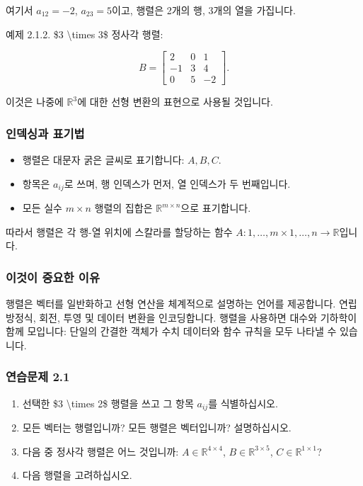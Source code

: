 \documentclass[
  12pt,
  a4paper,
]{article}
\begin{document}
여기서 \(a_{12} = -2\), \(a_{23} = 5\)이고, 행렬은 2개의 행, 3개의 열을 가집니다.

예제 2.1.2. \$3 \textbackslash times 3\$ 정사각 행렬:

\[B = \begin{bmatrix}
2 & 0 & 1 \\
-1 & 3 & 4 \\
0 & 5 & -2
\end{bmatrix}.\]

이것은 나중에 \(\mathbb{R}^3\)에 대한 선형 변환의 표현으로 사용될 것입니다.

\subsubsection{인덱싱과 표기법}\label{indexing-and-notation}

\begin{itemize}
\item
  행렬은 대문자 굵은 글씨로 표기합니다: \(A, B, C\).
\item
  항목은 \(a_{ij}\)로 쓰며, 행 인덱스가 먼저, 열 인덱스가 두 번째입니다.
\item
  모든 실수 \(m \times n\) 행렬의 집합은 \(\mathbb{R}^{m \times n}\)으로 표기합니다.
\end{itemize}

따라서 행렬은 각 행-열 위치에 스칼라를 할당하는 함수 \(A: {1,\dots,m} \times {1,\dots,n} \to \mathbb{R}\)입니다.

\subsubsection{이것이 중요한 이유}\label{why-this-matters-4}

행렬은 벡터를 일반화하고 선형 연산을 체계적으로 설명하는 언어를 제공합니다. 연립 방정식, 회전, 투영 및 데이터 변환을 인코딩합니다. 행렬을 사용하면 대수와 기하학이 함께 모입니다: 단일의 간결한 객체가 수치 데이터와 함수 규칙을 모두 나타낼 수 있습니다.

\subsubsection{연습문제 2.1}\label{exercises-21}

\begin{enumerate}
\def\labelenumi{\arabic{enumi}.}
\item
  선택한 \$3 \textbackslash times 2\$ 행렬을 쓰고 그 항목 \(a_{ij}\)를 식별하십시오.
\item
  모든 벡터는 행렬입니까? 모든 행렬은 벡터입니까? 설명하십시오.
\item
  다음 중 정사각 행렬은 어느 것입니까: \(A \in \mathbb{R}^{4\times4}\), \(B \in \mathbb{R}^{3\times5}\), \(C \in \mathbb{R}^{1\times1}\)?
\item
  다음 행렬을 고려하십시오.
\end{enumerate}
\end{document}
